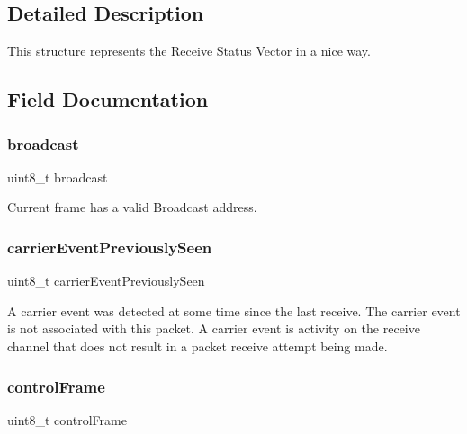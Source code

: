 \subsection{Detailed Description}
This structure represents the Receive Status Vector in a nice way. 

\subsection{Field Documentation}
\mbox{\label{struct_r_s_v__t_a6e3870c14f08dc47009ee5358a0f06bb}} 
\subsubsection{\texorpdfstring{broadcast}{broadcast}}
{\footnotesize\ttfamily uint8\+\_\+t broadcast}



Current frame has a valid Broadcast address. 

\mbox{\label{struct_r_s_v__t_a009a3b631b303f95d25e18876d2bcf6c}} 
\subsubsection{\texorpdfstring{carrierEventPreviouslySeen}{carrierEventPreviouslySeen}}
{\footnotesize\ttfamily uint8\+\_\+t carrier\+Event\+Previously\+Seen}

A carrier event was detected at some time since the last receive. The carrier event is not associated with this packet. A carrier event is activity on the receive channel that does not result in a packet receive attempt being made. \mbox{\label{struct_r_s_v__t_aa35d3ed42d81d27aa06f55388ac07d2d}} 
\subsubsection{\texorpdfstring{controlFrame}{controlFrame}}
{\footnotesize\ttfamily uint8\+\_\+t control\+Frame}



